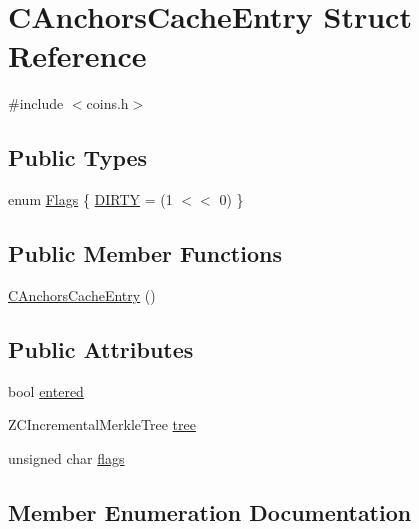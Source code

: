 \hypertarget{struct_c_anchors_cache_entry}{}\section{C\+Anchors\+Cache\+Entry Struct Reference}
\label{struct_c_anchors_cache_entry}


{\ttfamily \#include $<$coins.\+h$>$}

\subsection*{Public Types}
\begin{DoxyCompactItemize}
\item 
enum \mbox{\hyperlink{struct_c_anchors_cache_entry_aaf2aa4f4663f8bdd074097c1850be878}{Flags}} \{ \mbox{\hyperlink{struct_c_anchors_cache_entry_aaf2aa4f4663f8bdd074097c1850be878aae0255f04162d6f09aaaeac34ecaedbd}{D\+I\+R\+TY}} = (1 $<$$<$ 0)
 \}
\end{DoxyCompactItemize}
\subsection*{Public Member Functions}
\begin{DoxyCompactItemize}
\item 
\mbox{\hyperlink{struct_c_anchors_cache_entry_a878e921414637acb2c1bb937616d9ed9}{C\+Anchors\+Cache\+Entry}} ()
\end{DoxyCompactItemize}
\subsection*{Public Attributes}
\begin{DoxyCompactItemize}
\item 
bool \mbox{\hyperlink{struct_c_anchors_cache_entry_a8f7bb74fd03bad6d4492a1d6528531e5}{entered}}
\item 
Z\+C\+Incremental\+Merkle\+Tree \mbox{\hyperlink{struct_c_anchors_cache_entry_a226001cb91886f33a603d449b39f28a0}{tree}}
\item 
unsigned char \mbox{\hyperlink{struct_c_anchors_cache_entry_a9d421b72885a038bb1586b5fb07fd660}{flags}}
\end{DoxyCompactItemize}


\subsection{Member Enumeration Documentation}
\mbox{\label{struct_c_anchors_cache_entry_aaf2aa4f4663f8bdd074097c1850be878}} 
